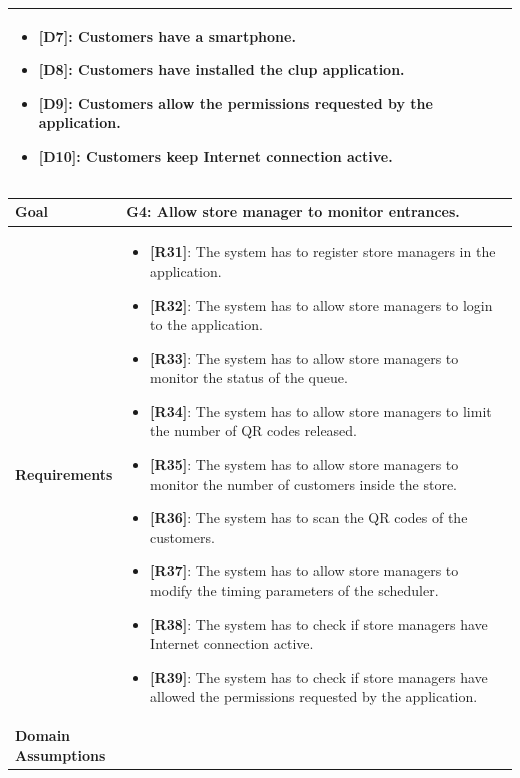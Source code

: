 \begin{table}[H]
\begin{tabular}{| m{} | m{} |}
		\begin{itemize}
			\item {\textbf{[D7]}}: Customers have a smartphone.
			\item {\textbf{[D8]}}: Customers have installed the \gls{clup} application.
			\item {\textbf{[D9]}}: Customers allow the permissions requested by the application.
			\item {\textbf{[D10]}}: Customers keep Internet connection active.
		\end{itemize} \\ 
	\hline
\end{tabular}
\end{table}

\begin{table}[H]
\centering
\begin{tabular}{| m{} | m{} |} 
	\hline
	\textbf{Goal} &
		\textbf{G4: Allow store manager to monitor entrances.} \\
	\hline
	\textbf{Requirements} &
		\begin{itemize}
			\item {\textbf{[R31]}}: The system has to register store managers in the application.
			\item {\textbf{[R32]}}: The system has to allow store managers to login to the application.
			\item {\textbf{[R33]}}: The system has to allow store managers to monitor the status of the queue.
			\item {\textbf{[R34]}}: The system has to allow store managers to limit the number of QR codes released.
			\item {\textbf{[R35]}}: The system has to allow store managers to monitor the number of customers inside the store.
			\item {\textbf{[R36]}}: The system has to scan the QR codes of the customers.
			\item {\textbf{[R37]}}: The system has to allow store managers to modify the timing parameters of the scheduler.
			\item {\textbf{[R38]}}: The system has to check if store managers have Internet connection active.
			\item {\textbf{[R39]}}: The system has to check if store managers have allowed the permissions requested by the application.
		\end{itemize} \\ 
	\hline
	\shortstack[l]{\textbf{Domain} \\ \textbf{Assumptions}} & 

\end{tabular}
\end{table}
